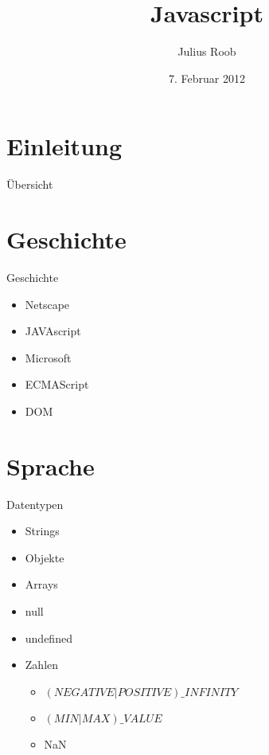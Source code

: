\documentclass{beamer}
\author{Julius Roob}
\title{Javascript}
\subtitle{}
\institute{Chaos inKL.}
\date{7. Februar 2012}
\begin{document}
	\section{Einleitung}
		\begin{frame}
			\titlepage
		\end{frame}
	
		\begin{frame}{Übersicht}
			\tableofcontents
		\end{frame}
	
	
	\section{Geschichte}
		\begin{frame}{Geschichte}{}
			\begin{itemize}
				\item Netscape
				\item JAVAscript
				\item Microsoft
				\item ECMAScript
				\item DOM
			\end{itemize}
		\end{frame}

	\section{Sprache}
		\begin{frame}{Datentypen}{}
			\begin{itemize}
				\item Strings
				\item Objekte
				\item Arrays
				\item null
				\item undefined
				\item Zahlen
					\begin{itemize}
						\item $(NEGATIVE|POSITIVE)\_INFINITY$
						\item $(MIN|MAX)\_VALUE$
						\item NaN
					\end{itemize}
			\end{itemize}
		\end{frame}
\end{document}
